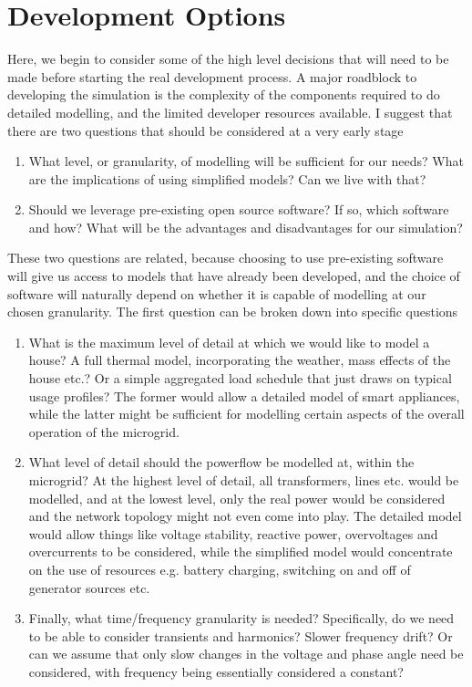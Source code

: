 \documentclass[12pt]{article}
\begin{document}
\section{Development Options}

Here, we begin to consider some of the high level decisions that will need to be made before starting the real development process. A major roadblock to developing the simulation is the complexity of the components required to do detailed modelling, and the limited developer resources available. I suggest that there are two questions that should be considered at a very early stage
\begin{enumerate}
\item What level, or granularity, of modelling will be sufficient for our needs? What are the implications of using simplified models? Can we live with that?
\item Should we leverage pre-existing open source software? If so, which software and how? What will be the advantages and disadvantages for our simulation? 
\end{enumerate}
These two questions are related, because choosing to use pre-existing software will give us access to models that have already been developed, and the choice of software will naturally depend on whether it is capable of modelling at our chosen granularity. The first question can be broken down into specific questions
\begin{enumerate}
\item What is the maximum level of detail at which we would like to model a house? A full thermal model, incorporating the weather, mass effects of the house etc.? Or a simple aggregated load schedule that just draws on typical usage profiles? The former would allow a detailed model of smart appliances, while the latter might be sufficient for modelling certain aspects of the overall operation of the microgrid.
\item What level of detail should the powerflow be modelled at, within the microgrid? At the highest level of detail, all transformers, lines etc. would be modelled, and at the lowest level, only the real power would be considered and the network topology might not even come into play. The detailed model would allow things like voltage stability, reactive power, overvoltages and overcurrents to be considered, while the simplified model would concentrate on the use of resources e.g. battery charging, switching on and off of generator sources etc.  \item Finally, what time/frequency granularity is needed? Specifically, do we need to be able to consider transients and harmonics? Slower frequency drift? Or can we assume that only slow changes in the voltage and phase angle need be considered, with frequency being essentially considered a constant?
\end{enumerate}
\end{document}
